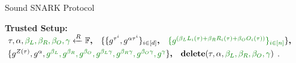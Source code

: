 \documentclass{zkdl-presentation-template}
\begin{document}
    \begin{frame}{Sound SNARK Protocol}
        \scriptsize

        \textbf{Trusted Setup: }
        $\tau, \alpha, \textcolor{green!50!black}{\beta_L, \beta_R, \beta_O, \gamma} \xleftarrow{R} \mathbb{F} \textbf{,} \quad \{ \{g^{\tau^i}, g^{\alpha \tau^i} \}_{i \in [d]}\textbf{,} \quad \textcolor{green!50!black}{\{g^{\left( \beta_LL_i(\tau) + \beta_RR_i(\tau) + \beta_OO_i(\tau) \right)}\}_{i \in \left[ n \right]}} \} \textbf{,}$
        $\{ g^{Z(\tau)}, g^{\alpha}, \textcolor{green!50!black}{g^{\beta_L}, g^{\beta_R}, g^{\beta_O}, g^{\beta_L\gamma}, g^{\beta_R\gamma}, g^{\beta_O\gamma}, g^{\gamma}}\}\textbf{,} \quad \textbf{delete}(\tau, \alpha, \textcolor{green!50!black}{\beta_L, \beta_R, \beta_O, \gamma})$.
        \vspace{10pt}


        \begin{center}
\end{center}
\end{frame}
\end{document}
